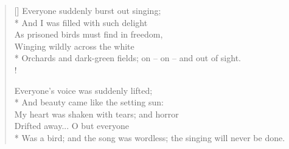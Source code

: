 \documentclass[MAIN]{subfiles}
\begin{document}
\settowidth{\versewidth}{Was a bird; and the song was wordless; the}
\begin{verse}[\versewidth]
Everyone suddenly burst out singing;\\*
And I was filled with such delight\\
As prisoned birds must find in freedom,\\
Winging wildly across the white\\*
Orchards and dark-green fields; on -- on -- and out of sight.\\!

Everyone's voice was suddenly lifted;\\*
And beauty came like the setting sun:\\
My heart was shaken with tears; and horror\\
Drifted away... O but everyone\\*
Was a bird; and the song was wordless; the singing will never be done.
\end{verse}
\end{document}
